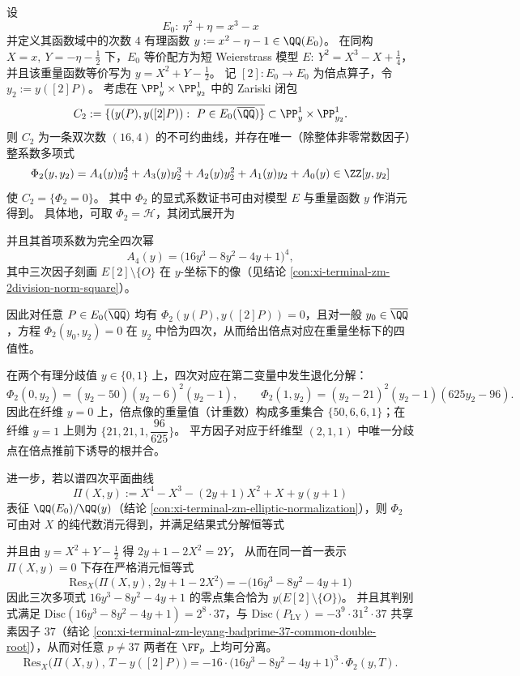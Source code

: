 \begin{conclusion}\label{con:xi-terminal-zm-elliptic-weight-doubling-modular-equation}
设
\[
E_0:\ \eta^{2}+\eta=x^{3}-x
\]
并定义其函数域中的次数 \(4\) 有理函数
\(
y:=x^{2}-\eta-1\in\QQ(E_0)
\)。
在同构
\(
X=x,\ Y=-\eta-\tfrac12
\)
下，\(E_0\) 等价配方为短 Weierstrass 模型
\(
E:\ Y^{2}=X^{3}-X+\tfrac14
\)，并且该重量函数等价写为 \(y=X^{2}+Y-\tfrac12\)。
记 \([2]:E_0\to E_0\) 为倍点算子，令 \(y_{2}:=y([2]P)\)。
考虑在 \(\PP^{1}_{y}\times \PP^{1}_{y_{2}}\) 中的 Zariski 闭包
\[
C_{2}:=\overline{\{(y(P),y([2]P)):\ P\in E_0(\overline{\QQ})\}}\subset \PP^{1}_{y}\times \PP^{1}_{y_{2}}.
\]
则 \(C_{2}\) 为一条双次数 \((16,4)\) 的不可约曲线，并存在唯一（除整体非零常数因子）整系数多项式
\[
\Phi_{2}(y,y_{2})=A_{4}(y)y_{2}^{4}+A_{3}(y)y_{2}^{3}+A_{2}(y)y_{2}^{2}+A_{1}(y)y_{2}+A_{0}(y)\in\ZZ[y,y_{2}]
\]
使 \(C_{2}=\{\Phi_{2}=0\}\)。
其中 \(\Phi_{2}\) 的显式系数证书可由对模型 \(E\) 与重量函数 \(y\) 作消元得到。
具体地，可取 \(\Phi_{2}=\mathcal H\)，其闭式展开为

并且其首项系数为完全四次幂
\[
A_{4}(y)=\bigl(16y^{3}-8y^{2}-4y+1\bigr)^{4},
\]
其中三次因子刻画 \(E[2]\setminus\{O\}\) 在 \(y\)-坐标下的像（见结论 \ref{con:xi-terminal-zm-2division-norm-square}）。
\par
因此对任意 \(P\in E_0(\overline{\QQ})\) 均有 \(\Phi_{2}(y(P),y([2]P))=0\)，且对一般 \(y_{0}\in\overline{\QQ}\)，方程 \(\Phi_{2}(y_{0},y_{2})=0\) 在 \(y_{2}\) 中恰为四次，从而给出倍点对应在重量坐标下的四值性。
\par
在两个有理分歧值 \(y\in\{0,1\}\) 上，四次对应在第二变量中发生退化分解：
\[
\Phi_{2}(0,y_{2})=(y_{2}-50)(y_{2}-6)^{2}(y_{2}-1),\qquad
\Phi_{2}(1,y_{2})=(y_{2}-21)^{2}(y_{2}-1)(625y_{2}-96).
\]
因此在纤维 \(y=0\) 上，倍点像的重量值（计重数）构成多重集合 \(\{50,6,6,1\}\)；在纤维 \(y=1\) 上则为 \(\{21,21,1,\dfrac{96}{625}\}\)。
平方因子对应于纤维型 \((2,1,1)\) 中唯一分歧点在倍点推前下诱导的根并合。
\par
进一步，若以谱四次平面曲线
\[
\Pi(X,y):=X^{4}-X^{3}-(2y+1)X^{2}+X+y(y+1)
\]
表征 \(\QQ(E_0)/\QQ(y)\)（结论 \ref{con:xi-terminal-zm-elliptic-normalization}），则 \(\Phi_{2}\) 可由对 \(X\) 的纯代数消元得到，并满足结果式分解恒等式
\par
并且由 \(y=X^{2}+Y-\tfrac12\) 得
\(
2y+1-2X^{2}=2Y
\)，
从而在同一首一表示 \(\Pi(X,y)=0\) 下存在严格消元恒等式
\[
\boxed{\;
\mathrm{Res}_{X}\bigl(\Pi(X,y),\,2y+1-2X^{2}\bigr)
=-\bigl(16y^{3}-8y^{2}-4y+1\bigr)\;}
\]
因此三次多项式 \(16y^{3}-8y^{2}-4y+1\) 的零点集合恰为 \(y\bigl(E[2]\setminus\{O\}\bigr)\)。
并且其判别式满足 \(\mathrm{Disc}(16y^{3}-8y^{2}-4y+1)=2^{8}\cdot 37\)，与 \(\mathrm{Disc}(P_{\mathrm{LY}})=-3^{9}\cdot 31^{2}\cdot 37\) 共享素因子 \(37\)（结论 \ref{con:xi-terminal-zm-leyang-badprime-37-common-double-root}），从而对任意 \(p\neq 37\) 两者在 \(\FF_{p}\) 上均可分离。
\[
\mathrm{Res}_{X}\bigl(\Pi(X,y),\,T-y([2]P)\bigr)
=-16\cdot\bigl(16y^{3}-8y^{2}-4y+1\bigr)^{3}\cdot \Phi_{2}(y,T).
\]
\end{conclusion}
